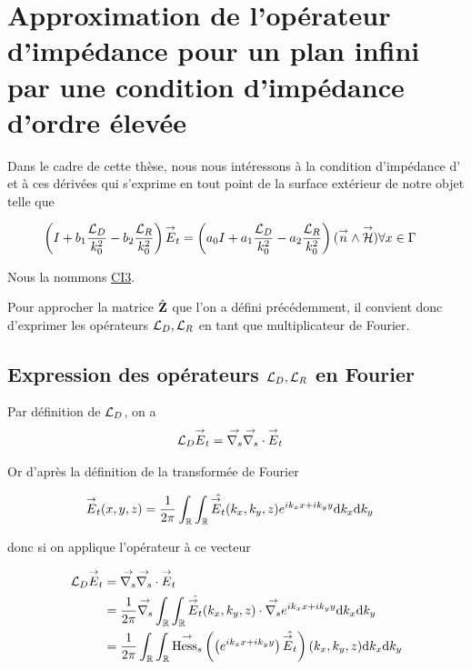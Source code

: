 \section{Approximation de l'opérateur d'impédance pour un plan infini par une condition d'impédance d'ordre élevée}

    Dans le cadre de cette thèse, nous nous intéressons à la condition d'impédance d'\cite{aubakirov_electromagnetic_2014} et à ces dérivées qui s'exprime en tout point de la surface extérieur de notre objet telle que

    \begin{align}
        \left(I + b_1 \dfrac{{\mathcal{L}_D}}{k_0^2} - b_2 \dfrac{{\mathcal{L}_R}}{k_0^2} \right){\overset{\rightarrow}{E}}_t = \left(a_0 I + a_1 \dfrac{{\mathcal{L}_D}}{k_0^2} - a_2 \dfrac{{\mathcal{L}_R}}{k_0^2} \right)({\overset{\rightarrow}{n}} \wedge {\overset{\rightarrow}{\mathcal{H}}}) & \forall x \in \Gamma
    \end{align}

    Nous la nommons \hyperlink{ci3}{CI3}.

    Pour approcher la matrice \(\hat{\mathbf{Z}}\) que l'on a défini précédemment, il convient donc d'exprimer les opérateurs \({\mathcal{L}_D}, {\mathcal{L}_R}\) en tant que multiplicateur de Fourier.

  \subsection[Expression des opérateurs LD LR en Fourier]{Expression des opérateurs \({\mathcal{L}_D},{\mathcal{L}_R}\) en Fourier}

    Par définition de \({\mathcal{L}_D}\), on a
    \begin{align}
      {\mathcal{L}_D} {\overset{\rightarrow}{E}}_t & = {\overset{\rightarrow}{\nabla_s}}{} {\overset{\rightarrow}{\nabla_s}} \cdot{} {\overset{\rightarrow}{E}}_t
    \end{align}

    Or d’après la définition de la transformée de Fourier

    \begin{align}
      {\overset{\rightarrow}{E}}_t(x,y,z) & = \dfrac{1}{2\pi}\int_\mathbb R\int_\mathbb R \hat{{\overset{\rightarrow}{E}}_t}(k_x,k_y,z)e^{ik_xx + ik_yy}\mathrm{d}{k_x}\mathrm{d}{k_y}
    \end{align}

    donc si on applique l'opérateur à ce vecteur

    \begin{align}
      {\mathcal{L}_D} {\overset{\rightarrow}{E}}_t
      & = {\overset{\rightarrow}{\nabla_s}}{} {\overset{\rightarrow}{\nabla_s}} \cdot{} {\overset{\rightarrow}{E}}_t
      \\
      &=\dfrac{1}{2\pi}{\overset{\rightarrow}{\nabla_s}}{} \int_\mathbb R\int_\mathbb R \hat{{\overset{\rightarrow}{E}}_t}(k_x,k_y,z) \cdot {\overset{\rightarrow}{\nabla_s}}{} e^{ik_xx + ik_yy}\mathrm{d}{k_x}\mathrm{d}{k_y}
      \\
      &=\dfrac{1}{2\pi}\int_\mathbb R \int_\mathbb R {\overset{\rightarrow}{\operatorname{Hess}_s}}{}\left(\left( e^{ik_xx + ik_yy} \right) \hat{{\overset{\rightarrow}{E}}_t}\right)(k_x,k_y,z)\mathrm{d}{k_x}\mathrm{d}{k_y}
    \end{align}

